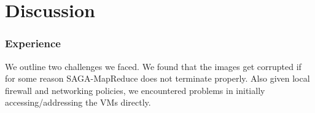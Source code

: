 \documentclass[conference,final]{IEEEtran}
\newcommand{\sagamapreduce }{SAGA-MapReduce }
\begin{document}
\section{Discussion}





\subsubsection*{Experience}
We outline two challenges we faced. We found that the images get
corrupted if for some reason \sagamapreduce does not terminate
properly. Also given local firewall and networking policies, we
encountered problems in initially accessing/addressing the VMs
directly.
\end{document}
